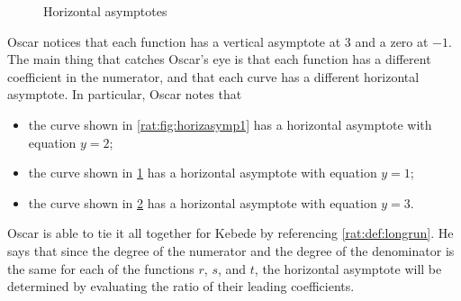 \begin{pccexample}
\begin{figure}[!htb]
\begin{subfigure}{\figurewidth}
            \caption{}
            \label{rat:fig:horizasymp2}
    \end{subfigure}
    \hfill
    \begin{subfigure}{\figurewidth}
            \caption{}
            \label{rat:fig:horizasymp3}
    \end{subfigure}
        \caption{Horizontal asymptotes}
        \label{rat:fig:horizasymp}
\end{figure}

Oscar notices that each function has a vertical asymptote at $3$ and a zero at $-1$. 
The main thing that catches Oscar's eye is that each function has a different 
coefficient in the numerator, and that each curve has a different horizontal asymptote. 
In particular, Oscar notes that
\begin{itemize}
 \item the curve shown in \cref{rat:fig:horizasymp1} has a horizontal asymptote with equation $y=2$;
 \item the curve shown in \cref{rat:fig:horizasymp2} has a horizontal asymptote with equation $y=1$;
 \item the curve shown in \cref{rat:fig:horizasymp3} has a horizontal asymptote with equation $y=3$.
\end{itemize}
 Oscar is able to tie it all together for Kebede by referencing \cref{rat:def:longrun}. He says 
 that since the degree of the numerator and the degree of the denominator is the same 
 for each of the functions $r$, $s$, and $t$, the horizontal asymptote will be determined 
 by evaluating the ratio of their leading coefficients. 


\end{pccexample}
